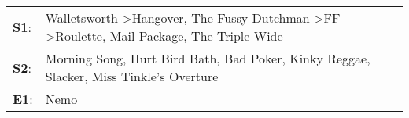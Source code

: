 \begin{supertabular}{p{0.03\textwidth}p{0.92\textwidth}}
 \textbf{S1}:  &  Walletsworth\textsuperscript{} \textgreater \enspace Hangover\textsuperscript{}, \enspace The Fussy Dutchman\textsuperscript{} \textgreater \enspace FF\textsuperscript{} \textgreater \enspace Roulette\textsuperscript{}, \enspace Mail Package\textsuperscript{}, \enspace The Triple Wide\textsuperscript{}  \enspace  \\
 \textbf{S2}:  &                                                                  Morning Song\textsuperscript{}, \enspace Hurt Bird Bath\textsuperscript{}, \enspace Bad Poker\textsuperscript{}, \enspace Kinky Reggae\textsuperscript{}, \enspace Slacker\textsuperscript{}, \enspace Miss Tinkle's Overture\textsuperscript{}  \enspace  \\
 \textbf{E1}:  &                                                                                                                                                                                                                                                                                           Nemo\textsuperscript{}  \enspace  \\
\end{supertabular}
